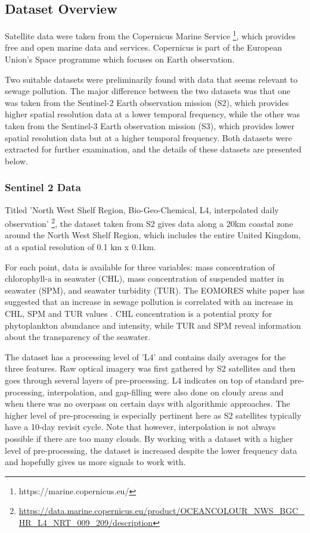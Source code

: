 \documentclass[a4paper,11pt]{report}
\begin{document}
\subsection{Dataset Overview}
Satellite data were taken from the Copernicus Marine Service \footnote{https://marine.copernicus.eu/}, which provides free and open marine data and services. Copernicus is part of the European Union's Space programme which focuses on Earth observation. 

Two suitable datasets were preliminarily found with data that seems relevant to sewage pollution. The major difference between the two datasets was that one was taken from the Sentinel-2 Earth observation mission (S2), which provides higher spatial resolution data at a lower temporal frequency, while the other was taken from the Sentinel-3 Earth observation mission (S3), which provides lower spatial resolution data but at a higher temporal frequency. Both datasets were extracted for further examination, and the details of these datasets are presented below.

\subsubsection{Sentinel 2 Data}
\label{sec:Sentinel2}

Titled 'North West Shelf Region, Bio-Geo-Chemical, L4, interpolated daily observation' \footnote{\href{https://data.marine.copernicus.eu/product/OCEANCOLOUR_NWS_BGC_HR_L4_NRT_009_209/description}{https://data.marine.copernicus.eu/product/OCEANCOLOUR\_NWS\_BGC\_HR\_L4\_NRT\_009\_209/description}}, the dataset taken from S2 gives data along a 20km coastal zone around the North West Shelf Region, which includes the entire United Kingdom, at a spatial resolution of 0.1 km x 0.1km. 

For each point, data is available for three variables: mass concentration of chlorophyll-a in seawater (CHL), mass concentration of suspended matter in seawater (SPM), and seawater turbidity (TUR). The EOMORES white paper has suggested that an increase in sewage pollution is correlated with an increase in CHL, SPM and TUR values \citep{papathanasopoulou2019satellite}. CHL concentration is a potential proxy for phytoplankton abundance and intensity, while TUR and SPM reveal information about the transparency of the seawater. 

The dataset has a processing level of 'L4' and contains daily averages for the three features. Raw optical imagery was first gathered by S2 satellites and then goes through several layers of pre-processing. L4 indicates on top of standard pre-processing, interpolation, and gap-filling were also done on cloudy areas and when there was no overpass on certain days with algorithmic approaches. The higher level of pre-processing is especially pertinent here as S2 satellites typically have a 10-day revisit cycle. Note that however, interpolation is not always possible if there are too many clouds. By working with a dataset with a higher level of pre-processing, the dataset is increased despite the lower frequency data and hopefully gives us more signals to work with. 
\end{document}
